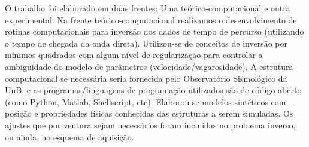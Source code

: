\documentclass[a4paper, 12 pt]{article} %
\begin{document}
O trabalho foi elaborado em duas frentes: Uma teórico-computacional e outra experimental. Na frente teórico-computacional realizamos o desenvolvimento de rotinas computacionais para inversão dos dados de tempo de percurso (utilizando o tempo de chegada da onda direta). Utilizou-se de conceitos de inversão por mínimos quadrados com algum nível de regularização para controlar a ambiguidade do modelo de parâmetros (velocidade/vagarosidade). A estrutura computacional se necessária seria fornecida pelo Observatório Sismológico da UnB, e os programas/linguagens de programação utilizados são de código aberto (como Python, Matlab, Shellscript, etc). Elaborou-se modelos sintéticos com posição e propriedades físicas conhecidas das estruturas a serem simuladas. Os ajustes que por ventura sejam necessários foram incluídas no problema inverso, ou ainda, no esquema de aquisição. 

\end{document}
